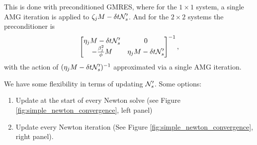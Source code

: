 \documentclass[review]{siamart}
\begin{document}
This is done with preconditioned GMRES, where for the $1 \times 1$ system, a single AMG iteration is applied to $\zeta_j M - \delta t {\cal N}'_s$. And for the 
$2 \times 2$ systems the preconditioner is 
\begin{align}
\begin{bmatrix}
\eta_j M  - \delta t {\cal N}'_s & 0 \\
-\tfrac{\beta^2_j}{\phi} M & \eta_j M  - \delta t {\cal N}'_s \\
\end{bmatrix}^{-1},
\end{align}
with the action of $(\eta_j M  - \delta t {\cal N}'_s)^{-1}$ approximated via a single AMG iteration.

We have some flexibility in terms of updating ${\cal N}'_s$. Some options:
\begin{enumerate}
\setlength\itemsep{0.5em}
\item Update at the start of every Newton solve (see Figure \ref{fig:simple_newton_convergence}, left panel)

\item Update every Newton iteration (See Figure \ref{fig:simple_newton_convergence}, right panel).
\end{enumerate}
\end{document}
